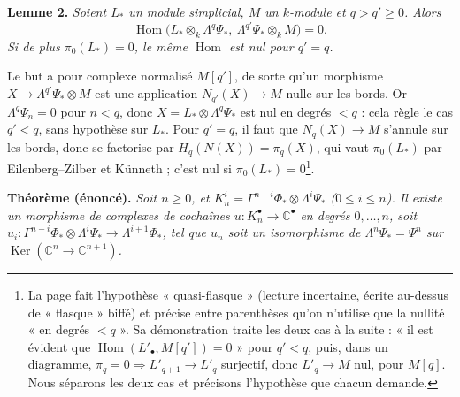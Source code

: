 \documentclass[11pt,a4paper]{article}
\begin{document}
\textbf{Lemme 2.} \emph{Soient $L_{*}$ un module simplicial, $M$ un
$k$-module et $q > q' \geqslant 0$. Alors
\[
  \operatorname{Hom}\bigl(L_{*} \otimes_{k} \Lambda^{q}\Psi_{*},\
  \Lambda^{q'}\Psi_{*} \otimes_{k} M\bigr) = 0 .
\]
Si de plus $\pi_{0}(L_{*}) = 0$, le même $\operatorname{Hom}$ est nul pour
$q' = q$.}

Le but a pour complexe normalisé $M[q']$, de sorte qu'un morphisme
$X \to \Lambda^{q'}\Psi_{*} \otimes M$ est une application
$N_{q'}(X) \to M$ nulle sur les bords. Or $\Lambda^{q}\Psi_{n} = 0$ pour
$n < q$, donc $X = L_{*} \otimes \Lambda^{q}\Psi_{*}$ est nul en degrés
$< q$ : cela règle le cas $q' < q$, sans hypothèse sur $L_{*}$. Pour
$q' = q$, il faut que $N_{q}(X) \to M$ s'annule sur les bords, donc se
factorise par $H_{q}(N(X)) = \pi_{q}(X)$, qui vaut $\pi_{0}(L_{*})$ par
Eilenberg–Zilber et Künneth ; c'est nul si $\pi_{0}(L_{*}) =
0$\footnote{La page fait l'hypothèse « quasi-flasque » (lecture incertaine,
écrite au-dessus de « flasque » biffé) et précise entre parenthèses qu'on
n'utilise que la nullité « en degrés $< q$ ». Sa démonstration traite les
deux cas à la suite : « il est évident que
$\operatorname{Hom}(L'_{\bullet}, M[q']) = 0$ » pour $q' < q$, puis, dans un
diagramme, $\pi_{q} = 0 \Rightarrow L'_{q+1} \to L'_{q}$ surjectif, donc
$L'_{q} \to M$ nul, pour $M[q]$. Nous séparons les deux cas et précisons
l'hypothèse que chacun demande.}.

\textbf{Théorème (énoncé).} \emph{Soit $n \geqslant 0$, et
$K_{n}^{i} = \Gamma^{n-i}\Phi_{*} \otimes \Lambda^{i}\Psi_{*}$
($0 \leqslant i \leqslant n$). Il existe un morphisme de complexes de
cochaînes $u : K_{n}^{\bullet} \to \mathbb{C}^{\bullet}$ en degrés
$0, \ldots, n$, soit $u_{i} : \Gamma^{n-i}\Phi_{*} \otimes
\Lambda^{i}\Psi_{*} \to \Lambda^{i+1}\Phi_{*}$, tel que $u_{n}$ soit un
isomorphisme de $\Lambda^{n}\Psi_{*} = \Psi^{n}$ sur
$\operatorname{Ker}(\mathbb{C}^{n} \to \mathbb{C}^{n+1})$.}
\end{document}
